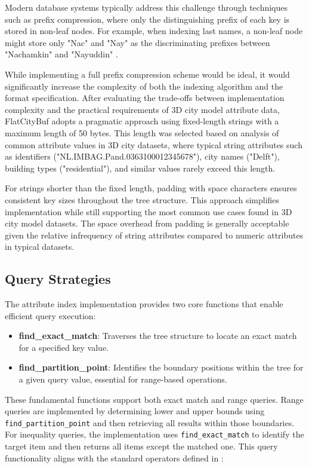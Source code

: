 Modern database systems typically address this challenge through techniques such as prefix compression, where only the distinguishing prefix of each key is stored in non-leaf nodes. For example, when indexing last names, a non-leaf node might store only "Nac" and "Nay" as the discriminating prefixes between "Nachamkin" and "Nayuddin" \citep{ramez_2015}.

While implementing a full prefix compression scheme would be ideal, it would significantly increase the complexity of both the indexing algorithm and the format specification. After evaluating the trade-offs between implementation complexity and the practical requirements of 3D city model attribute data, FlatCityBuf adopts a pragmatic approach using fixed-length strings with a maximum length of 50 bytes. This length was selected based on analysis of common attribute values in 3D city datasets, where typical string attributes such as identifiers ("NL.IMBAG.Pand.0363100012345678"), city names ("Delft"), building types ("residential"), and similar values rarely exceed this length.

For strings shorter than the fixed length, padding with space characters ensures consistent key sizes throughout the tree structure. This approach simplifies implementation while still supporting the most common use cases found in 3D city model datasets. The space overhead from padding is generally acceptable given the relative infrequency of string attributes compared to numeric attributes in typical datasets.

\subsection{Query Strategies}
\label{methodology:attribute_index:query_strategies}

The attribute index implementation provides two core functions that enable efficient query execution:

\begin{itemize}
  \item \textbf{find\_exact\_match}: Traverses the tree structure to locate an exact match for a specified key value.
  \item \textbf{find\_partition\_point}: Identifies the boundary positions within the tree for a given query value, essential for range-based operations.
\end{itemize}

These fundamental functions support both exact match and range queries. Range queries are implemented by determining lower and upper bounds using \texttt{find\_partition\_point} and then retrieving all results within those boundaries. For inequality queries, the implementation uses \texttt{find\_exact\_match} to identify the target item and then returns all items except the matched one. This query functionality aligns with the standard operators defined in \citet{ogc_filter_encoding_2010}:

